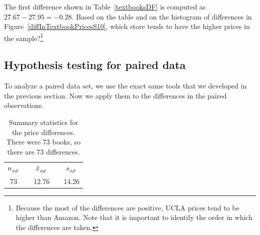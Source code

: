 \begin{exercise}
The first difference shown in Table~\ref{textbooksDF} is computed as $27.67-27.95=-0.28$. Based on the table and on the histogram of differences in Figure~\ref{diffInTextbookPricesS10}, which store tends to have the higher prices in the sample?\footnote{Because the most of the differences are positive, UCLA prices tend to be higher than Amazon. Note that it is important to identify the order in which the differences are taken.}
\end{exercise}


\subsection{Hypothesis testing for paired data}

To analyze a paired data set, we use the exact same tools that we developed in the previous section. Now we apply them to the differences in the paired observations.

\begin{table}[hh]
\centering
\begin{tabular}{ccccc}
\hline
$n_{_{\text{\emph{diff}}}}$	&\hspace{3mm}& $\bar{x}_{_{\text{\emph{diff}}}}$	&\hspace{3mm}& $s_{_{\text{\emph{diff}}}}$ \vspace{1mm}\\
73			&& 12.76				&& 14.26 \\
\hline
\end{tabular}
\caption{Summary statistics for the price differences. There were 73 books, so there are 73 differences.}
\label{textbooksSummaryStats}
\end{table}

